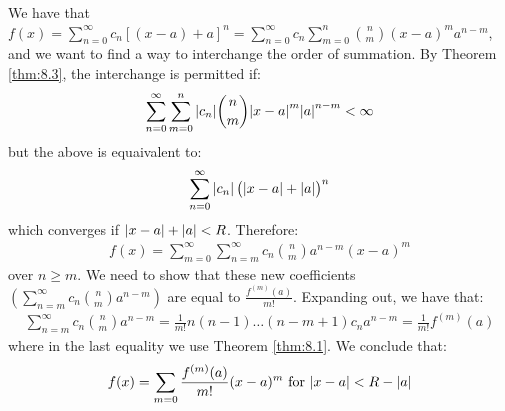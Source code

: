 \begin{nproof}
    We have that $f(x) = \sum_{n=0}^\infty c_n\left[(x - a) + a\right]^n = \sum_{n=0}^\infty c_n\sum_{m=0}^n \binom{n}{m}(x-a)^ma^{n-m}$, and we want to find a way to interchange the order of summation. By Theorem \ref{thm:8.3}, the interchange is permitted if:
    \begin{align*}
        \sum_{n=0}^\infty\sum_{m=0}^n \abs{c_n}\binom{n}{m}\abs{x-a}^m\abs{a}^{n-m} < \infty
    \end{align*}
    but the above is equaivalent to:
    \begin{align*}
        \sum_{n=0}^\infty \abs{c_n}\left(\abs{x - a} + \abs{a}\right)^n
    \end{align*}
    which converges if $\abs{x - a} + \abs{a} < R$. Therefore:
    \begin{align*}
        f(x) = \sum_{m=0}^\infty \sum_{n=m}^\infty c_n\binom{n}{m}a^{n-m}(x - a)^m
    \end{align*}
    over $n \geq m$. We need to show that these new coefficients $\left(\sum_{n=m}^\infty c_n\binom{n}{m}a^{n-m}\right)$ are equal to $\frac{f^{(m)}(a)}{m!}$. Expanding out, we have that:
    \begin{align*}
        \sum_{n=m}^\infty c_n\binom{n}{m}a^{n-m} = \frac{1}{m!}n(n-1)\ldots (n-m+1)c_na^{n-m} = \frac{1}{m!}f^{(m)}(a)
    \end{align*}
    where in the last equality we use Theorem \ref{thm:8.1}. We conclude that:
    \begin{align*}
        f(x) = \sum_{m=0}\frac{f^{(m)}(a)}{m!}(x-a)^m \text{ for } \abs{x - a} < R - \abs{a}
    \end{align*}
\end{nproof}

